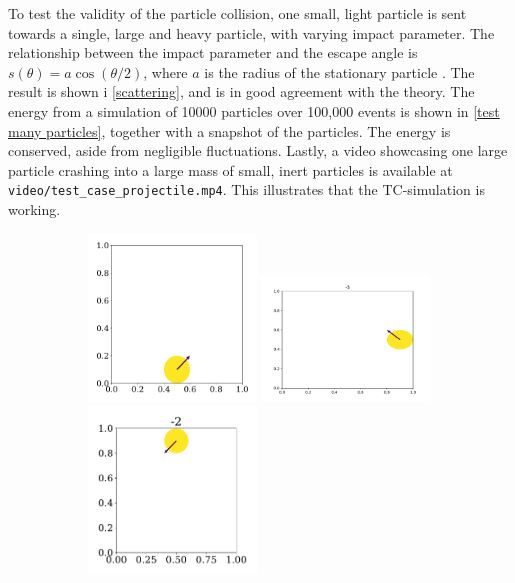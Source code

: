 \documentclass{article}
\begin{document}
    
    To test the validity of the particle collision, one small, light particle is sent towards a single, large and heavy particle, with varying impact parameter.
    The relationship between the impact parameter and the escape angle is $s(\theta) = a \cos(\theta / 2)$, where $a$ is the radius of the stationary particle \cite{klasmek}.
    The result is shown i \autoref{scattering}, and is in good agreement with the theory.
    The energy from a simulation of 10000 particles over 100,000 events is shown in \autoref{test many particles}, together with a snapshot of the particles.
    The energy is conserved, aside from negligible fluctuations.
    Lastly, a video showcasing one large particle crashing into a large mass of small, inert particles is available at \verb|video/test_case_projectile.mp4|. This illustrates that the TC-simulation is working.
    \begin{figure}[H]
        \centering
        \begin{subfigure}{.35\textwidth}
            \centering
            \includegraphics[width=0.49\textwidth]{../plots/test_case_one_particle/particle-4.pdf}
            \includegraphics[width=0.49\textwidth]{../plots/test_case_one_particle/particle-3.pdf}
            \includegraphics[width=0.49\textwidth]{../plots/test_case_one_particle/particle-2.pdf}

\end{subfigure}
\end{figure}
\end{document}
